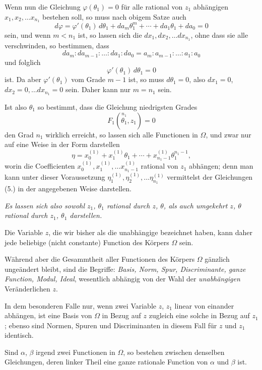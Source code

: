 \documentclass{article}
\begin{document}
Wenn nun die Gleichung $\varphi(\theta_{1}) = 0$ für alle rational von $z_{1}$ abhängigen $x_{1}, x_{2}, \ldots x_{n_{1}}$ bestehen soll, so muss nach obigem Satze auch
\[ d\varphi = \varphi'(\theta_{1})\,d\theta_{1} + da_{m}\theta_{1}^{m} + \cdots + da_{1}\theta_{1} + da_{0} = 0 \]
sein, und wenn $m < n_{1}$ ist, so lassen sich die $dx_{1}, dx_{2}, \ldots dx_{n_{1}}$, ohne dass sie alle verschwinden, so bestimmen, dass
\[ da_{m} : da_{m-1} : \ldots : da_{1} : da_{0} = a_{m} : a_{m-1} : \ldots : a_{1} : a_{0} \]
und folglich
\[ \varphi'(\theta_{1})\,d\theta_{1} = 0 \]
ist. Da aber $\varphi'(\theta_{1})$ vom Grade $m-1$ ist, so muss $d\theta_{1} = 0$, also $dx_{1} = 0$, $dx_{2} = 0, \ldots dx_{n_{1}} = 0$ sein. Daher kann nur $m = n_{1}$ sein.

Ist also $\theta_{1}$ so bestimmt, dass die Gleichung niedrigsten Grades
\[ F_{1}(\overset{n_{1}}{\theta_{1}}, z_{1}) = 0 \]
den Grad $n_{1}$ wirklich erreicht, so lassen sich alle Functionen in $\Omega$, und zwar nur auf eine Weise in der Form darstellen
\[ \eta = x_{0}^{(1)} + x_{1}^{(1)}\theta_{1} + \cdots + x_{n_{1}-1}^{(1)}\theta_{1}^{n_{1}-1}, \]
worin die Coefficienten $x_{0}^{(1)}, x_{1}^{(1)}, \ldots x_{n_{1}-1}^{(1)}$ rational von $z_{1}$ abhängen; denn man kann unter dieser Voraussetzung $\eta_{1}^{(1)}, \eta_{2}^{(1)}, \ldots \eta_{n_{1}}^{(1)}$ vermittelst der Gleichungen (5.) in der angegebenen Weise darstellen.

\emph{Es lassen sich also sowohl $z_{1}$, $\theta_{1}$ rational durch $z$, $\theta$, als auch umgekehrt $z$, $\theta$ rational durch $z_{1}$, $\theta_{1}$ darstellen.}

Die Variable $z$, die wir bisher als die unabhängige bezeichnet haben, kann daher jede beliebige (nicht constante) Function des Körpers $\Omega$ sein.

Während aber die Gesammtheit aller Functionen des Körpers $\Omega$ gänzlich ungeändert bleibt, sind die Begriffe: \emph{Basis, Norm, Spur, Discriminante, ganze Function, Modul, Ideal}, wesentlich abhängig von der Wahl der \emph{unabhängigen} Veränderlichen $z$.

In dem besonderen Falle nur, wenn zwei Variable $z$, $z_{1}$ linear von einander abhängen, ist eine Basis von $\Omega$ in Bezug auf $z$ zugleich eine solche in Bezug auf $z_{1}$; ebenso sind Normen, Spuren und Discriminanten in diesem Fall für $z$ und $z_{1}$ identisch.

Sind $\alpha$, $\beta$ irgend zwei Functionen in $\Omega$, so bestehen zwischen denselben Gleichungen, deren linker Theil eine ganze rationale Function von $\alpha$ und $\beta$ ist.
\end{document}
